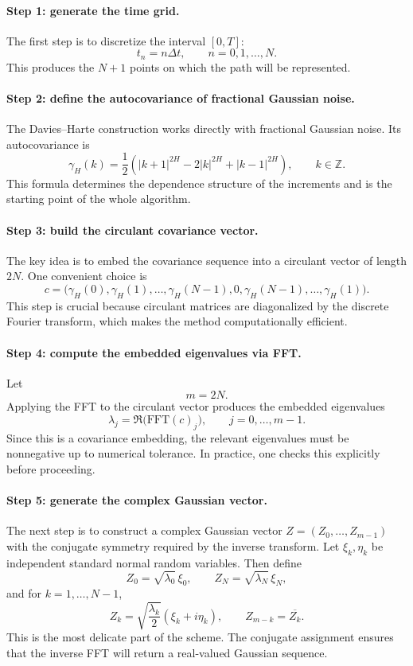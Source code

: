\paragraph{Step 1: generate the time grid.} The first step is to discretize the interval \([0,T]\):
\[
t_n=n\Delta t,
\qquad n=0,1,\dots,N.
\]
This produces the \(N+1\) points on which the path will be represented.

\paragraph{Step 2: define the autocovariance of fractional Gaussian noise.} The Davies--Harte construction works directly with fractional Gaussian noise. Its autocovariance is
\[
\gamma_H(k)
=
\frac{1}{2}
\left(
|k+1|^{2H}
-
2|k|^{2H}
+
|k-1|^{2H}
\right),
\qquad k\in\mathbb{Z}.
\]
This formula determines the dependence structure of the increments and is the starting point of the whole algorithm.

\paragraph{Step 3: build the circulant covariance vector.} The key idea is to embed the covariance sequence into a circulant vector of length \(2N\). One convenient choice is
\[
c=
\bigl(
\gamma_H(0),\gamma_H(1),\dots,\gamma_H(N-1),0,
\gamma_H(N-1),\dots,\gamma_H(1)
\bigr).
\]
This step is crucial because circulant matrices are diagonalized by the discrete Fourier transform, which makes the method computationally efficient.

\paragraph{Step 4: compute the embedded eigenvalues via FFT.} Let
\[
m=2N.
\]
Applying the FFT to the circulant vector produces the embedded eigenvalues
\[
\lambda_j=\Re\bigl(\mathrm{FFT}(c)_j\bigr),
\qquad j=0,\dots,m-1.
\]
Since this is a covariance embedding, the relevant eigenvalues must be nonnegative up to numerical tolerance. In practice, one checks this explicitly before proceeding.

\paragraph{Step 5: generate the complex Gaussian vector.} The next step is to construct a complex Gaussian vector \(Z=(Z_0,\dots,Z_{m-1})\) with the conjugate symmetry required by the inverse transform. Let \(\xi_k,\eta_k\) be independent standard normal random variables. Then define
\[
Z_0=\sqrt{\lambda_0}\,\xi_0,
\qquad
Z_N=\sqrt{\lambda_N}\,\xi_N,
\]
and for \(k=1,\dots,N-1\),
\[
Z_k
=
\sqrt{\frac{\lambda_k}{2}}
\left(\xi_k+i\eta_k\right),
\qquad
Z_{m-k}=\overline{Z_k}.
\]
This is the most delicate part of the scheme. The conjugate assignment ensures that the inverse FFT will return a real-valued Gaussian sequence.


